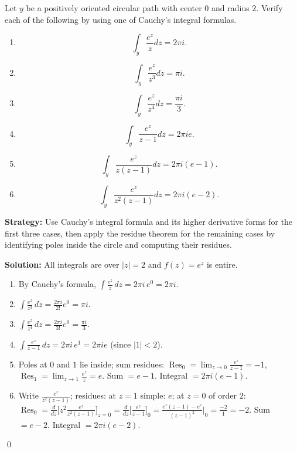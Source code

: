 \begin{problembox}
Let \( y \) be a positively oriented circular path with center 0 and radius 2. Verify each of the following by using one of Cauchy's integral formulas.
\begin{enumerate}[label=(\alph*)]
\item \[ \int_y \frac{e^z}{z} dz = 2\pi i. \]
\item \[ \int_y \frac{e^z}{z^3} dz = \pi i. \]
\item \[ \int_y \frac{e^z}{z^4} dz = \frac{\pi i}{3}. \]
\item \[ \int_y \frac{e^z}{z - 1} dz = 2\pi ie. \]
\item \[ \int_y \frac{e^z}{z(z - 1)} dz = 2\pi i(e - 1). \]
\item \[ \int_y \frac{e^z}{z^2(z - 1)} dz = 2\pi i(e - 2). \]
\end{enumerate}
\end{problembox}

\noindent\textbf{Strategy:} Use Cauchy's integral formula and its higher derivative forms for the first three cases, then apply the residue theorem for the remaining cases by identifying poles inside the circle and computing their residues.

\bigskip\noindent\textbf{Solution:}
All integrals are over $|z|=2$ and $f(z)=e^z$ is entire.
\begin{enumerate}[label=(\alph*)]
\item By Cauchy's formula, $\int\frac{e^z}{z}\,dz=2\pi i\,e^0=2\pi i$.
\item $\int\frac{e^z}{z^3}\,dz=\frac{2\pi i}{2!}e^0=\pi i$.
\item $\int\frac{e^z}{z^4}\,dz=\frac{2\pi i}{3!}e^0=\frac{\pi i}{3}$.
\item $\int\frac{e^z}{z-1}\,dz=2\pi i\,e^1=2\pi i e$ (since $|1|<2$).
\item Poles at $0$ and $1$ lie inside; sum residues: $\operatorname{Res}_{0}=\lim_{z\to0}\frac{e^z}{z-1}=-1$, $\operatorname{Res}_{1}=\lim_{z\to1}\frac{e^z}{z}=e$. Sum $=e-1$. Integral $=2\pi i(e-1)$.
\item Write $\frac{e^z}{z^2(z-1)}$; residues: at $z=1$ simple: $e$; at $z=0$ of order $2$: $\operatorname{Res}_{0}=\frac{d}{dz}\big[z^2\frac{e^z}{z^2(z-1)}\big]_{z=0}=\frac{d}{dz}\big[\frac{e^z}{z-1}\big]_{0}=\frac{e^z(z-1)-e^z}{(z-1)^2}\Big|_{0}=\frac{-2}{1}= -2$. Sum $=e-2$. Integral $=2\pi i(e-2)$.
\end{enumerate}\qed



